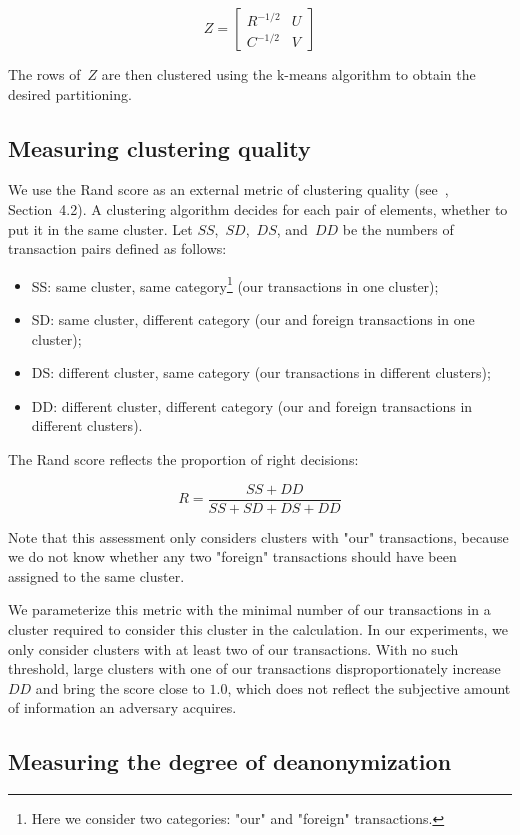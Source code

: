 \[
Z = 
\begin{bmatrix}
R^{-1/2} & U \\
C^{-1/2} & V
\end{bmatrix}
\]

The rows of~$Z$ are then clustered using the k-means algorithm to obtain the desired partitioning.


\subsection{Measuring clustering quality}

We use the Rand score as an external metric of clustering quality (see~\cite{Amigo2009}, Section~4.2).
A clustering algorithm decides for each pair of elements, whether to put it in the same cluster.
Let $SS$,~$SD$,~$DS$, and~$DD$ be the numbers of transaction pairs defined as follows:
\begin{itemize}
	\item SS: same cluster, same category\footnote{Here we consider two categories: "our" and "foreign" transactions.} (our transactions in one cluster);
	\item SD: same cluster, different category (our and foreign transactions in one cluster);
	\item DS: different cluster, same category (our transactions in different clusters);
	\item DD: different cluster, different category (our and foreign transactions in different clusters).
\end{itemize}

The Rand score reflects the proportion of right decisions:

\[
R = \frac{SS + DD}{SS + SD + DS + DD}
\]

Note that this assessment only considers clusters with "our" transactions, because we do not know whether any two "foreign" transactions should have been assigned to the same cluster.

We parameterize this metric with the minimal number of our transactions in a cluster required to consider this cluster in the calculation.
In our experiments, we only consider clusters with at least two of our transactions.
With no such threshold, large clusters with one of our transactions disproportionately increase $DD$ and bring the score close to $1.0$, which does not reflect the subjective amount of information an adversary acquires.


\subsection{Measuring the degree of deanonymization}

